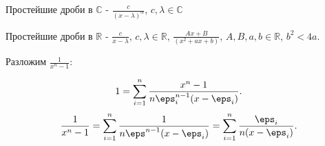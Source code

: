 \begin{example} \thmslashn

    Простейшие дроби в $\mathbb{C}$ - $\frac{c}{(x-\lambda)^{\alpha}}$, $c,\lambda\in \mathbb{C}$

    Простейшие дроби в $\mathbb{R}$ - $\frac{c}{x-\lambda}$, $c, \lambda\in \mathbb{R}$, $\frac{Ax+B}{(x^2+ax+b)}$, $A,B,a,b\in \mathbb{R}$, $b^2 < 4a$.

    Разложим $\frac{1}{x^{n} - 1}$:

    \[ 1 = \sum\limits_{i=1}^{n} \frac{x^{n}-1}{n\eps_{i}^{n-1}(x-\eps_{i})} .\]
    \[ \frac{1}{x^{n}-1} = \sum\limits_{i=1}^{n} \frac{1}{n\eps^{n-1}(x-\eps_{i})} = \sum\limits_{i=1}^{n} \frac{\eps_{i}}{n(x-\eps_{i})} .\] 
\end{example}
